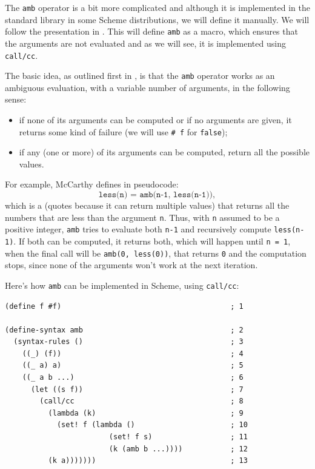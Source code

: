 \vspace{0.3cm}

The \texttt{amb} operator is a bit more complicated and although it is
implemented in the standard library in some Scheme distributions, we will
define it manually. We will follow the presentation in \cite{nondet}. This
will define \texttt{amb} as a macro, which ensures that the arguments are not
evaluated and as we will see, it is implemented using \texttt{call/cc}.

The basic idea, as outlined first in \cite{mccarthy61}, is that the \texttt{amb}
operator works as an ambiguous evaluation, with a variable number of arguments,
in the following sense:
\begin{itemize}
\item if none of its arguments can be computed or if no arguments are given,
  it returns some kind of failure (we will use \texttt{\# f} for \texttt{false});
\item if any (one or more) of its arguments can be computed, return all the
  possible values.
\end{itemize}

For example, McCarthy defines in pseudocode:
\[
  \texttt{less(n) = amb(n-1, less(n-1))},
\]
which is a  (quotes because it can return multiple values)
that returns all the numbers that are less than the argument \texttt{n}. Thus,
with \texttt{n} assumed to be a positive integer, \texttt{amb} tries to evaluate
both \texttt{n-1} and recursively compute \texttt{less(n-1)}. If both can be computed,
it returns both, which will happen until \texttt{n = 1}, when the final call will be
\texttt{amb(0, less(0))}, that returns \texttt{0} and the computation stops, since
none of the arguments won't work at the next iteration.

Here's how \texttt{amb} can be implemented in Scheme, using \texttt{call/cc}:
{
  \small
\begin{verbatim}
(define f #f)                                       ; 1

(define-syntax amb                                  ; 2
  (syntax-rules ()                                  ; 3
    ((_) (f))                                       ; 4
    ((_ a) a)                                       ; 5
    ((_ a b ...)                                    ; 6
      (let ((s f))                                  ; 7
        (call/cc                                    ; 8
          (lambda (k)                               ; 9
            (set! f (lambda ()                      ; 10
                        (set! f s)                  ; 11
                        (k (amb b ...))))           ; 12
          (k a)))))))                               ; 13
\end{verbatim}
}

